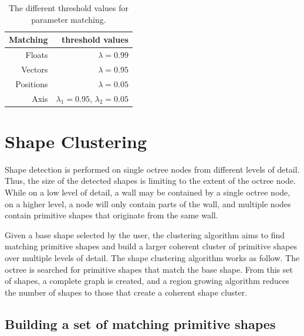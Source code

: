 \begin{table}
\centering
\begin{tabular}{ r | r }
    Matching  & threshold values \\
  \hline
  Floats    & $\lambda = 0.99$ \\
  Vectors     & $\lambda = 0.95$ \\
  Positions    & $\lambda = 0.05$ \\ 
  Axis        & $\lambda_1 = 0.95$, $\lambda_2 = 0.05$\\  

\end{tabular}
\caption[Different threshold values for parameter matching]
{The different threshold values for parameter matching.}
\label{tab:matchingThresholds}
\end{table}


\section{Shape Clustering}
\label{sec:shapeClustering}


Shape detection is performed on single octree nodes from different levels of detail. Thus, the size of the detected shapes is limiting to the extent of the octree node. While on a low level of detail, a wall may be contained by a single octree node, on a higher level, a node will only contain parts of the wall, and multiple nodes contain primitive shapes that originate from the same wall. 

\par

Given a base shape selected by the user, the clustering algorithm aims to find matching primitive shapes and build a larger coherent cluster of primitive shapes over multiple levels of detail. The shape clustering algorithm works as follow. The octree is searched for primitive shapes that match the base shape. From this set of shapes, a complete graph is created, and a region growing algorithm reduces the number of shapes to those that create a coherent shape cluster. 


\subsection{Building a set of matching primitive shapes}
\label{sec:matchingSetBuilding}

